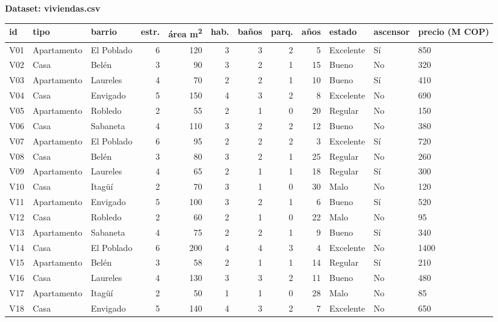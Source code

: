 \documentclass[11pt]{article}
\begin{document}
\begin{landscape}
\thispagestyle{fancy}
\begin{center}
{\bfseries\color{esumerNavy} Dataset: viviendas.csv}
\end{center}
\vspace{4pt}
\footnotesize
\renewcommand{\arraystretch}{1.15}
\begin{center}
\begin{tabular}{@{}lllrrrrrrlll@{}}
\toprule
\textbf{id} & \textbf{tipo} & \textbf{barrio} & \textbf{estr.} & \textbf{área m\textsuperscript{2}} & \textbf{hab.} & \textbf{baños} & \textbf{parq.} & \textbf{años} & \textbf{estado} & \textbf{ascensor} & \textbf{precio (M COP)} \\
\midrule
V01 & Apartamento & El Poblado & 6 & 120 & 3 & 3 & 2 & 5  & Excelente & Sí & 850 \\
V02 & Casa        & Belén      & 3 & 90  & 3 & 2 & 1 & 15 & Bueno     & No & 320 \\
V03 & Apartamento & Laureles   & 4 & 70  & 2 & 2 & 1 & 10 & Bueno     & Sí & 410 \\
V04 & Casa        & Envigado   & 5 & 150 & 4 & 3 & 2 & 8  & Excelente & No & 690 \\
V05 & Apartamento & Robledo    & 2 & 55  & 2 & 1 & 0 & 20 & Regular   & No & 150 \\
V06 & Casa        & Sabaneta   & 4 & 110 & 3 & 2 & 2 & 12 & Bueno     & No & 380 \\
V07 & Apartamento & El Poblado & 6 & 95  & 2 & 2 & 2 & 3  & Excelente & Sí & 720 \\
V08 & Casa        & Belén      & 3 & 80  & 3 & 2 & 1 & 25 & Regular   & No & 260 \\
V09 & Apartamento & Laureles   & 4 & 65  & 2 & 1 & 1 & 18 & Regular   & Sí & 300 \\
V10 & Casa        & Itagüí     & 2 & 70  & 3 & 1 & 0 & 30 & Malo      & No & 120 \\
V11 & Apartamento & Envigado   & 5 & 100 & 3 & 2 & 1 & 6  & Bueno     & Sí & 520 \\
V12 & Casa        & Robledo    & 2 & 60  & 2 & 1 & 0 & 22 & Malo      & No & 95  \\
V13 & Apartamento & Sabaneta   & 4 & 75  & 2 & 2 & 1 & 9  & Bueno     & Sí & 340 \\
V14 & Casa        & El Poblado & 6 & 200 & 4 & 4 & 3 & 4  & Excelente & No & 1400 \\
V15 & Apartamento & Belén      & 3 & 58  & 2 & 1 & 1 & 14 & Regular   & Sí & 210 \\
V16 & Casa        & Laureles   & 4 & 130 & 3 & 3 & 2 & 11 & Bueno     & No & 480 \\
V17 & Apartamento & Itagüí     & 2 & 50  & 1 & 1 & 0 & 28 & Malo      & No & 85  \\
V18 & Casa        & Envigado   & 5 & 140 & 4 & 3 & 2 & 7  & Excelente & No & 650 \\
\bottomrule
\end{tabular}
\end{center}
\end{landscape}
\end{document}
